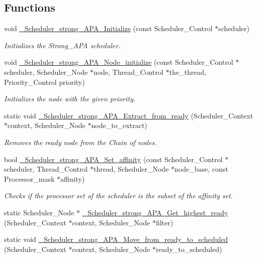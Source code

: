 \subsection*{Functions}
\begin{DoxyCompactItemize}
\item 
void \hyperlink{group__RTEMSScoreSchedulerStrongAPA_gafcd6fde337d7542784698219322b6365}{\+\_\+\+Scheduler\+\_\+strong\+\_\+\+A\+P\+A\+\_\+\+Initialize} (const Scheduler\+\_\+\+Control $\ast$scheduler)
\begin{DoxyCompactList}\small\item\em Initializes the Strong\+\_\+\+A\+PA scheduler. \end{DoxyCompactList}\item 
void \hyperlink{group__RTEMSScoreSchedulerStrongAPA_ga1cde4345d4dc0b5a37a696fa446bb47e}{\+\_\+\+Scheduler\+\_\+strong\+\_\+\+A\+P\+A\+\_\+\+Node\+\_\+initialize} (const Scheduler\+\_\+\+Control $\ast$scheduler, Scheduler\+\_\+\+Node $\ast$node, Thread\+\_\+\+Control $\ast$the\+\_\+thread, Priority\+\_\+\+Control priority)
\begin{DoxyCompactList}\small\item\em Initializes the node with the given priority. \end{DoxyCompactList}\item 
static void \hyperlink{group__RTEMSScoreSchedulerStrongAPA_ga60129e44fa73e5241abc2f5f9f78bb1d}{\+\_\+\+Scheduler\+\_\+strong\+\_\+\+A\+P\+A\+\_\+\+Extract\+\_\+from\+\_\+ready} (Scheduler\+\_\+\+Context $\ast$context, Scheduler\+\_\+\+Node $\ast$node\+\_\+to\+\_\+extract)
\begin{DoxyCompactList}\small\item\em Removes the ready node from the Chain of nodes. \end{DoxyCompactList}\item 
bool \hyperlink{group__RTEMSScoreSchedulerStrongAPA_ga63ef624a9881cf77a2b1eef2c6f05223}{\+\_\+\+Scheduler\+\_\+strong\+\_\+\+A\+P\+A\+\_\+\+Set\+\_\+affinity} (const Scheduler\+\_\+\+Control $\ast$scheduler, Thread\+\_\+\+Control $\ast$thread, Scheduler\+\_\+\+Node $\ast$node\+\_\+base, const Processor\+\_\+mask $\ast$affinity)
\begin{DoxyCompactList}\small\item\em Checks if the processor set of the scheduler is the subset of the affinity set. \end{DoxyCompactList}\item 
static Scheduler\+\_\+\+Node $\ast$ \hyperlink{group__RTEMSScoreSchedulerStrongAPA_gaeca59d69f6f261d5af4b17e73186ed98}{\+\_\+\+Scheduler\+\_\+strong\+\_\+\+A\+P\+A\+\_\+\+Get\+\_\+highest\+\_\+ready} (Scheduler\+\_\+\+Context $\ast$context, Scheduler\+\_\+\+Node $\ast$filter)
\item 
static void \hyperlink{group__RTEMSScoreSchedulerStrongAPA_gaaf649166522c7d7b2e9cca719d61e371}{\+\_\+\+Scheduler\+\_\+strong\+\_\+\+A\+P\+A\+\_\+\+Move\+\_\+from\+\_\+ready\+\_\+to\+\_\+scheduled} (Scheduler\+\_\+\+Context $\ast$context, Scheduler\+\_\+\+Node $\ast$ready\+\_\+to\+\_\+scheduled)
\end{DoxyCompactItemize}


